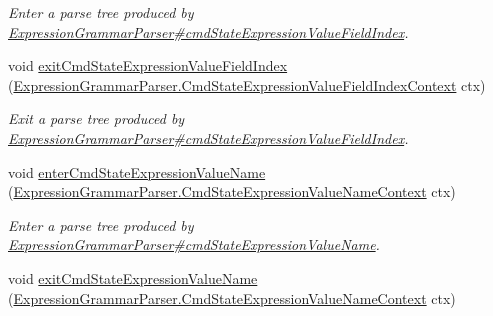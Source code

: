 \begin{DoxyCompactItemize}
\begin{DoxyCompactList}\small\item\em Enter a parse tree produced by \hyperlink{classgov_1_1nasa_1_1jpf_1_1inspector_1_1server_1_1expression_1_1parser_1_1_expression_grammar_parser_a300497ebff4ec0759e1a294e9d6a7920}{Expression\+Grammar\+Parser\#cmd\+State\+Expression\+Value\+Field\+Index}. \end{DoxyCompactList}\item 
void \hyperlink{interfacegov_1_1nasa_1_1jpf_1_1inspector_1_1server_1_1expression_1_1parser_1_1_expression_grammar_listener_af221085ed0a3105d49d6b93caf52f191}{exit\+Cmd\+State\+Expression\+Value\+Field\+Index} (\hyperlink{classgov_1_1nasa_1_1jpf_1_1inspector_1_1server_1_1expression_1_1parser_1_1_expression_grammar_pa31d705710a4d9acddfdd67c37ac04c8a}{Expression\+Grammar\+Parser.\+Cmd\+State\+Expression\+Value\+Field\+Index\+Context} ctx)
\begin{DoxyCompactList}\small\item\em Exit a parse tree produced by \hyperlink{classgov_1_1nasa_1_1jpf_1_1inspector_1_1server_1_1expression_1_1parser_1_1_expression_grammar_parser_a300497ebff4ec0759e1a294e9d6a7920}{Expression\+Grammar\+Parser\#cmd\+State\+Expression\+Value\+Field\+Index}. \end{DoxyCompactList}\item 
void \hyperlink{interfacegov_1_1nasa_1_1jpf_1_1inspector_1_1server_1_1expression_1_1parser_1_1_expression_grammar_listener_a75e0feebff6d4bafe82adfb71600ef0c}{enter\+Cmd\+State\+Expression\+Value\+Name} (\hyperlink{classgov_1_1nasa_1_1jpf_1_1inspector_1_1server_1_1expression_1_1parser_1_1_expression_grammar_pa79fe925a020ecc7299d05e3047f2cfe9}{Expression\+Grammar\+Parser.\+Cmd\+State\+Expression\+Value\+Name\+Context} ctx)
\begin{DoxyCompactList}\small\item\em Enter a parse tree produced by \hyperlink{classgov_1_1nasa_1_1jpf_1_1inspector_1_1server_1_1expression_1_1parser_1_1_expression_grammar_parser_ab7b7d7ff1d67db1969528b9cb4557d4e}{Expression\+Grammar\+Parser\#cmd\+State\+Expression\+Value\+Name}. \end{DoxyCompactList}\item 
void \hyperlink{interfacegov_1_1nasa_1_1jpf_1_1inspector_1_1server_1_1expression_1_1parser_1_1_expression_grammar_listener_a772028b0f6e6a729eb0a87b7b91f7f9a}{exit\+Cmd\+State\+Expression\+Value\+Name} (\hyperlink{classgov_1_1nasa_1_1jpf_1_1inspector_1_1server_1_1expression_1_1parser_1_1_expression_grammar_pa79fe925a020ecc7299d05e3047f2cfe9}{Expression\+Grammar\+Parser.\+Cmd\+State\+Expression\+Value\+Name\+Context} ctx)

\end{DoxyCompactItemize}
